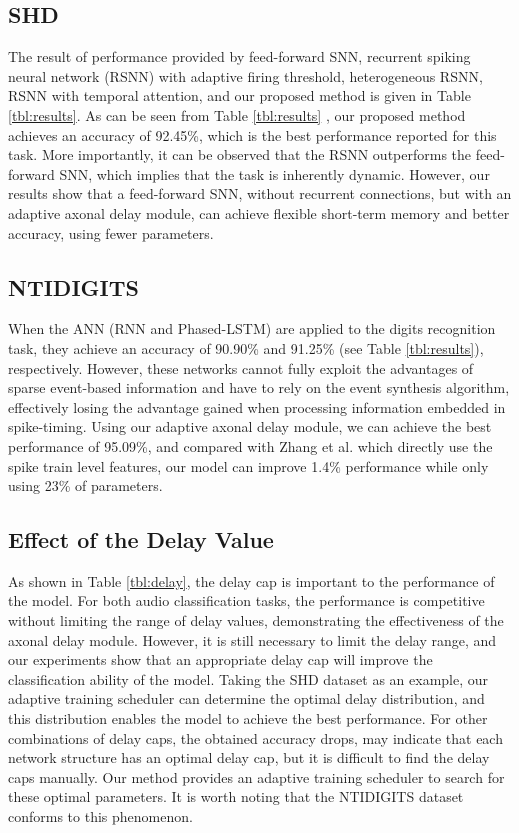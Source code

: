 \documentclass{article}
\begin{document}
\subsection{SHD}
The result of performance provided by feed-forward SNN, recurrent spiking neural network (RSNN) with adaptive firing threshold, heterogeneous RSNN, RSNN with temporal attention, and our proposed method is given in Table \ref{tbl:results}. As can be seen from Table \ref{tbl:results} , our proposed method achieves an accuracy of 92.45\%, which is the best performance reported for this task. More importantly, it can be observed that the RSNN outperforms the feed-forward SNN, which implies that the task is inherently dynamic. However, our results show that a feed-forward SNN, without recurrent connections, but with an adaptive axonal delay module, can achieve flexible short-term memory and better accuracy, using fewer parameters. 

\subsection{NTIDIGITS}
When the ANN (RNN and Phased-LSTM) are applied to the digits recognition task, they achieve an accuracy of 90.90\% and 91.25\% (see Table \ref{tbl:results}), respectively. However, these networks cannot fully exploit the advantages of sparse event-based information and have to rely on the event synthesis algorithm, effectively losing the advantage gained when processing information embedded in spike-timing. Using our adaptive axonal delay module, we can achieve the best performance of 95.09\%, and compared with Zhang et al.\cite{zhang2019spike} which  directly use the spike train level features, our model can improve  1.4\% performance while only using 23\% of parameters. 

\subsection{Effect of the Delay Value}
As shown in Table \ref{tbl:delay}, the delay cap is important to the performance of the model. For both audio classification tasks, the performance is competitive without limiting the range of delay values, demonstrating the effectiveness of the axonal delay module. However, it is still necessary to limit the delay range, and our experiments show that an appropriate delay cap will improve the classification ability of the model. Taking the SHD dataset as an example, our adaptive training scheduler can determine the optimal delay distribution, and this distribution enables the model to achieve the best performance. For other combinations of delay caps, the obtained accuracy drops, may indicate that each network structure has an optimal delay cap, but it is difficult to find the delay caps manually. Our method provides an adaptive training scheduler to search for these optimal parameters. It is worth noting that the NTIDIGITS dataset conforms to this phenomenon.
\end{document}
